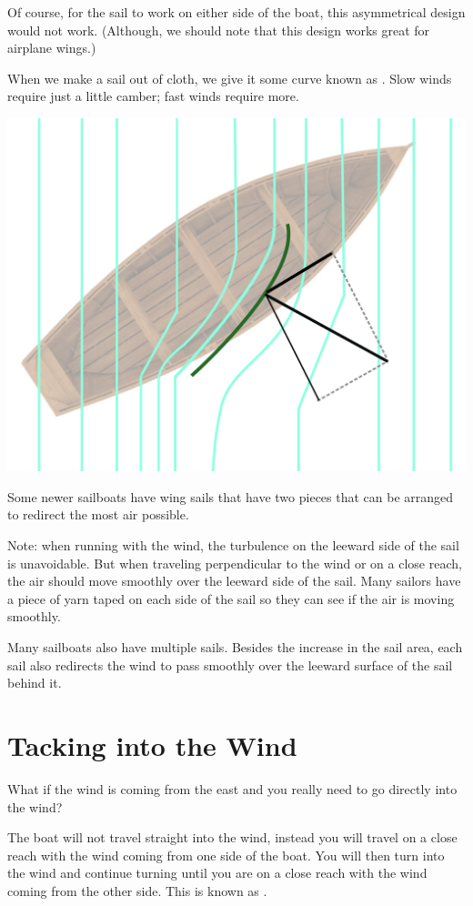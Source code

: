 Of course, for the sail to work on either side of the boat,  this asymmetrical design would not work.  (Although,  we should note that this design works great
for airplane wings.)

When we make a sail out of cloth,  we give it some curve known as .  Slow winds require just a little camber;  fast winds require more.

\begin{center}
    \includegraphics[width=.75\textwidth]{soft.png}
\end{center}


Some newer sailboats have wing sails that have two pieces that can be arranged to redirect the most air possible.

Note: when running with the wind,  the turbulence on the leeward side of the sail is unavoidable.   But when traveling perpendicular to the wind or on a close reach,  the air should move smoothly over the leeward side of the sail.   Many sailors have a piece of yarn taped on each side of the sail so they can see if the air is moving smoothly.

Many sailboats also have multiple sails.  Besides the increase in the sail area,  each sail also redirects the wind to pass smoothly over the leeward surface of the sail
behind it.
\section{Tacking into the Wind}

What if the wind is coming from the east and you really need to go directly into the wind?

The boat will not travel straight into the wind,  instead you will travel on a close reach with the wind coming from one side of the boat. You will then turn into the wind and continue turning
until you are on a close reach with the wind coming from the other side.  This is known as .

